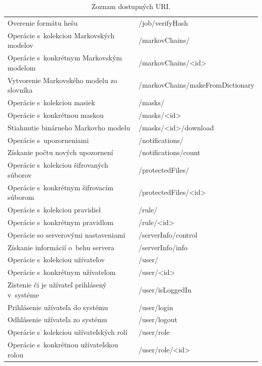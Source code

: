 \documentclass[slovak]{fitthesis}
\begin{document}
\begin{table}[h]
\begin{center}
\begin{tabular}{ |p{8cm}|p{7.4cm}|  }
          Overenie formátu hešu & /job/verifyHash \\
          Operácie s~kolekciou Markovských modelov & /markovChains/ \\
          Operácie s~konkrétnym Markovským modelom & /markovChains/<id> \\
          Vytvorenie Markovského modelu zo slovníka & /markovChains/makeFromDictionary \\
          Operácie s~kolekciou masiek & /masks/ \\
          Operácie s~konkrétnou maskou & /masks/<id> \\
          Stiahnutie binárneho Markovho modelu & /masks/<id>/download \\
          Operácie s~upozorneniami & /notifications/ \\
          Získanie počtu nových upozornení & /notifications/count \\
          Operácie s~kolekciou šifrovaných súborov & /protectedFiles/ \\
          Operácie s~konkrétnym šifrovacím súborom & /protectedFiles/<id> \\
          Operácie s~kolekciou pravidiel & /rule/ \\
          Operácie s~konkrétnym pravidlom & /rule/<id> \\
          Operácie so serverovými nastaveniami & /serverInfo/control \\
          Získanie informácií o~behu servera & /serverInfo/info \\
          Operácie s~kolekciou užívateľov & /user/ \\
          Operácie s~konkrétnym užívateľom & /user/<id> \\
          Zistenie či je užívateľ prihlásený v~systéme & /user/isLoggedIn \\
          Prihlásenie užívateľa do systému & /user/login \\
          Odhlásenie užívateľa zo systému & /user/logout \\
          Operácie s~kolekciou užívateľských rolí & /user/role \\
          Operácie s~konkrétnou užívateľskou rolou & /user/role/<id> \\
         \hline
        \end{tabular}
      \caption{Zoznam dostupných URI.}
      \label{zoznamURItable}
  \end{center}
\end{table}
\end{document}
